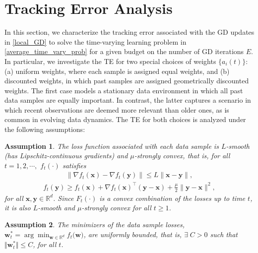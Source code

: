 \documentclass[conference]{IEEEtran}
\newcommand{\fraz}[1]{\textcolor{purple}{\bf [Fraz: #1]}}
\newcommand{\nm}[1]{\textcolor{magenta}{\bf [NM: #1]}}
\newtheorem{Ass}{Assumption}
\begin{document}
\section{Tracking Error Analysis}
\label{sec:TE_analysis}
In this section, we characterize the tracking error associated with the GD updates in \eqref{local_GD} to solve the time-varying learning problem in \eqref{average_time_vary_prob} for a given budget on the number of GD iterations $E$. In particular, we investigate the TE for two special choices of weights $\{a_i(t)\}$: (a) uniform weights, where each sample is assigned equal weights, and (b) discounted weights, in which past samples are assigned geometrically discounted weights. The first case models a stationary data environment in which all past data samples are equally important. In contrast, the latter captures a scenario in which recent observations are deemed more relevant than older ones, as is common in evolving data dynamics.
The TE for both choices is analyzed under the following assumptions:
\begin{Ass}
\label{ass:smooth_sc}
The loss function associated with each data sample is $L$-smooth (has Lipschitz-continuous gradients) and $\mu$-strongly convex, that is, for all $t = 1,2,\cdots,$ $f_t(\cdot)$ satisfies
\begin{align}\| \nabla f_t(\mathbf{x}) - \nabla f_t(\mathbf{y})\| \leq L\| \mathbf{x} - \mathbf{y}\|,\end{align}
\begin{align}
f_t(\mathbf{y}) \geq f_t(\mathbf{x}) + \nabla f_t(\mathbf{x})^\top(\mathbf{y} - \mathbf{x}) + \frac{\mu}{2}\| \mathbf{y} - \mathbf{x} \|^2,  
\end{align}  
for all $\mathbf{x},\mathbf{y} \in \mathbb{R}^d$. Since $F_t(\cdot)$ is a convex combination of the losses up to time $t$, it is also $L$-smooth and $\mu$-strongly convex for all $t \geq 1$.
\end{Ass}
\begin{Ass}
\label{ass:bounded_minimizers}
The minimizers of the data sample losses, $\mathbf{w}^*_t = \arg \min_{\mathbf{w} \in \mathbb{R}^d} f_t(\mathbf{w)}$, are uniformly bounded, that is, $\exists \;C >0$ such that $\Vert\mathbf{w}^*_t \Vert \leq C $, for all $t$. 
\end{Ass}
\end{document}
